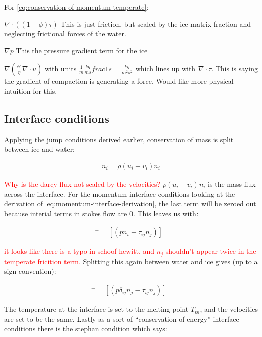 \documentclass[a4paper,12pt]{article}
\begin{document}
\begin{outline}
\1 For \eqref{eq:conservation-of-momentum-temperate}:

\2 $\nabla \cdot ((1-\phi)\tau)$ This is just friction, but scaled by the ice matrix fraction and neglecting frictional forces of the water.

\2 $\nabla p$ This the pressure gradient term for the ice

\2 $\nabla(\frac{\phi^2}{\eta}\nabla \cdot u)$ with units $\frac{1}{m}\frac{kg}{ms}frac{1}{s} = \frac{kg}{m^2 s^2}$ which lines up with $\nabla \cdot \tau$. This is saying the gradient of compaction is generating a force. Would like more physical intuition for this.

\end{outline}

\subsection{Interface conditions}

Applying the jump conditions derived earlier, conservation of mass is split between ice and water:

\begin{align}
  [\rho^I(1 - \phi)(u_i - w_i) + \rho^w \phi (u_i - v_i) + \rho^w j_i]n_i = \rho(u_i - v_i)n_i
\end{align}

\textcolor{red}{Why is the darcy flux not scaled by the velocities?}
$\rho(u_i - v_i)n_i$ is the mass flux across the interface.
For the momentum interface conditions looking at the derivation of \eqref{eq:momentum-interface-derivation}, the last term will be zeroed out because interial terms in stokes flow are 0. This leaves us with:

\begin{align}
  [(pn_i - \tau_{ij}n_j)]^+ = [(pn_i - \tau_{ij}n_j)]^-
\end{align}

\textcolor{red}{it looks like there is a typo in schoof  hewitt, and $n_j$ shouldn't appear twice in the temperate fricition term.} Splitting this again between water and ice gives (up to a sign convention):

\begin{align}
    [-\phi p^w\delta_{ij} n_j - (1 - \phi)p\delta_{ij}n_j + (1 - \phi)\tau_{ij}n_j]^+ = [(p\delta_{ij}n_j - \tau_{ij}n_j)]^-
\end{align}

The temperature at the interface is set to the melting point $T_m$, and the velocities are set to be the same. Lastly as a sort of ``conservation of energy'' interface conditions there is the stephan condition which says:
\end{document}
